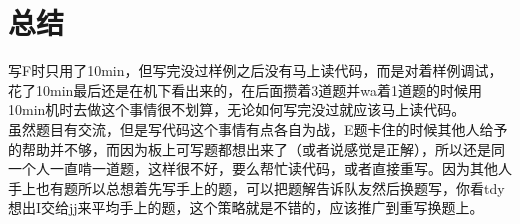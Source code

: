 \documentclass[a4paper, 11pt, nofonts, nocap, fancyhdr]{ctexart}
\begin{document}
\section{总结}

写F时只用了10min，但写完没过样例之后没有马上读代码，而是对着样例调试，花了10min最后还是在机下看出来的，在后面攒着3道题并wa着1道题的时候用10min机时去做这个事情很不划算，无论如何写完没过就应该马上读代码。\\
虽然题目有交流，但是写代码这个事情有点各自为战，E题卡住的时候其他人给予的帮助并不够，而因为板上可写题都想出来了（或者说感觉是正解），所以还是同一个人一直啃一道题，这样很不好，要么帮忙读代码，或者直接重写。因为其他人手上也有题所以总想着先写手上的题，可以把题解告诉队友然后换题写，你看tdy想出I交给jj来平均手上的题，这个策略就是不错的，应该推广到重写换题上。
\end{document}
